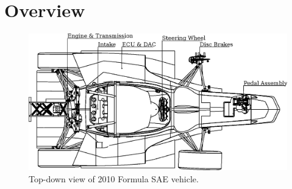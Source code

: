 \section{Overview}

\begin{figure}[H]
\centering
\includegraphics[width=6in,keepaspectratio]{background/figures/background_diagram.eps}
\caption{Top-down view of 2010 Formula SAE vehicle.}
\label{fig:s80pro_product}
\end{figure}
